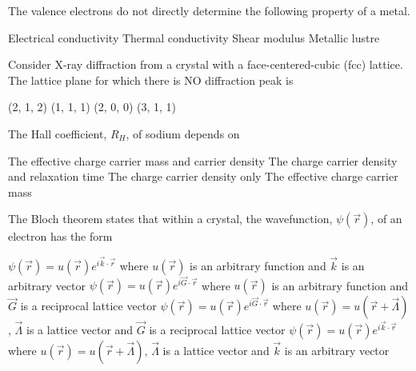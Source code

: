 \documentclass{exam}
\begin{document}
\begin{questions}
\question The valence electrons do not directly determine the following property of a metal.\hfill{}

\begin{choices}
\begin{multicols}{2}
\choice Electrical conductivity
\choice Thermal conductivity
\choice Shear modulus
\choice Metallic lustre
\end{multicols}
\end{choices}

\question Consider X-ray diffraction from a crystal with a face-centered-cubic (fcc) lattice. The lattice plane for which there is NO diffraction peak is\hfill{}

\begin{oneparchoices}
	\choice (2, 1, 2) \choice (1, 1, 1) \choice (2, 0, 0) \choice (3, 1, 1)
\end{oneparchoices}

\question The Hall coefficient, $R_H$, of sodium depends on\hfill{}

\begin{choices}
\choice The effective charge carrier mass and carrier density
\choice The charge carrier density and relaxation time
\choice The charge carrier density only
\choice The effective charge carrier mass
\end{choices}

\question The Bloch theorem states that within a crystal, the wavefunction, $\psi(\vec{r})$, of an electron has the form\hfill{}

\begin{choices}
	\choice $\psi(\vec{r})=u(\vec{r})e^{i\vec{k}\cdot\vec{r}}$ where $u(\vec{r})$ is an arbitrary function and $\vec{k}$ is an arbitrary vector
	\choice $\psi(\vec{r})=u(\vec{r})e^{i\vec{G}\cdot\vec{r}}$ where $u(\vec{r})$ is an arbitrary function and $\vec{G}$ is a reciprocal lattice vector
	\choice $\psi(\vec{r})=u(\vec{r})e^{i\vec{G}\cdot\vec{r}}$ where $u(\vec{r})=u(\vec{r}+\vec{\Lambda})$, $\vec{\Lambda}$ is a lattice vector and $\vec{G}$ is a reciprocal lattice vector
	\choice $\psi(\vec{r})=u(\vec{r})e^{i\vec{k}\cdot\vec{r}}$ where $u(\vec{r})=u(\vec{r}+\vec{\Lambda})$, $\vec{\Lambda}$ is a lattice vector and $\vec{k}$ is an arbitrary vector
\end{choices}


\end{questions}
\end{document}

